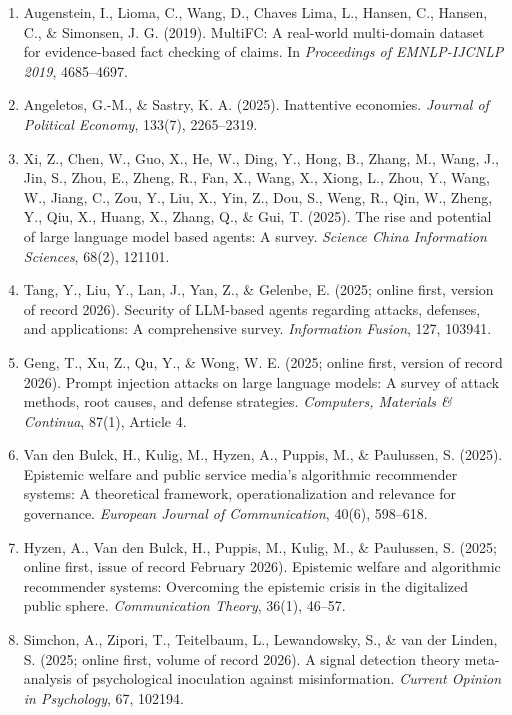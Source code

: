 \documentclass[
  11pt]{article}
\begin{document}
\begin{enumerate}
{  Information and Knowledge Management (CIKM)}, 3338--3342.
\item
  Augenstein, I., Lioma, C., Wang, D., Chaves Lima, L., Hansen, C.,
  Hansen, C., \& Simonsen, J. G. (2019). MultiFC: A real-world
  multi-domain dataset for evidence-based fact checking of claims. In
  \emph{Proceedings of EMNLP-IJCNLP 2019}, 4685--4697.
\item
  Angeletos, G.-M., \& Sastry, K. A. (2025). Inattentive economies.
  \emph{Journal of Political Economy}, 133(7), 2265--2319.
\item
  Xi, Z., Chen, W., Guo, X., He, W., Ding, Y., Hong, B., Zhang, M.,
  Wang, J., Jin, S., Zhou, E., Zheng, R., Fan, X., Wang, X., Xiong, L.,
  Zhou, Y., Wang, W., Jiang, C., Zou, Y., Liu, X., Yin, Z., Dou, S.,
  Weng, R., Qin, W., Zheng, Y., Qiu, X., Huang, X., Zhang, Q., \& Gui,
  T. (2025). The rise and potential of large language model based
  agents: A survey. \emph{Science China Information Sciences}, 68(2),
  121101.
\item
  Tang, Y., Liu, Y., Lan, J., Yan, Z., \& Gelenbe, E. (2025; online
  first, version of record 2026). Security of LLM-based agents regarding
  attacks, defenses, and applications: A comprehensive survey.
  \emph{Information Fusion}, 127, 103941.
\item
  Geng, T., Xu, Z., Qu, Y., \& Wong, W. E. (2025; online first, version
  of record 2026). Prompt injection attacks on large language models: A
  survey of attack methods, root causes, and defense strategies.
  \emph{Computers, Materials \& Continua}, 87(1), Article 4.
\item
  Van den Bulck, H., Kulig, M., Hyzen, A., Puppis, M., \& Paulussen, S.
  (2025). Epistemic welfare and public service media's algorithmic
  recommender systems: A theoretical framework, operationalization and
  relevance for governance. \emph{European Journal of Communication},
  40(6), 598--618.
\item
  Hyzen, A., Van den Bulck, H., Puppis, M., Kulig, M., \& Paulussen, S.
  (2025; online first, issue of record February 2026). Epistemic welfare
  and algorithmic recommender systems: Overcoming the epistemic crisis
  in the digitalized public sphere. \emph{Communication Theory}, 36(1),
  46--57.
\item
  Simchon, A., Zipori, T., Teitelbaum, L., Lewandowsky, S., \& van der
  Linden, S. (2025; online first, volume of record 2026). A signal
  detection theory meta-analysis of psychological inoculation against
  misinformation. \emph{Current Opinion in Psychology}, 67, 102194.

\end{enumerate}
\end{document}
